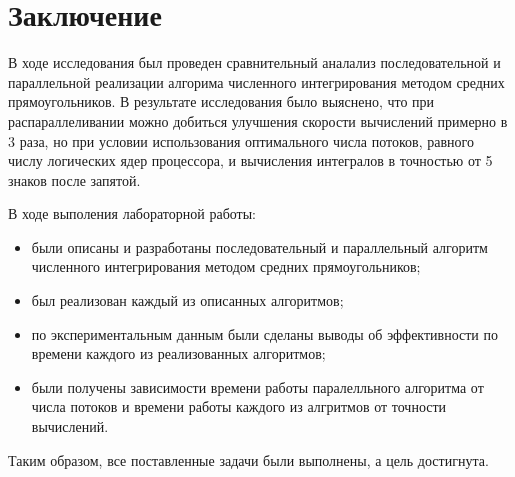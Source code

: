 \chapter*{Заключение}

В ходе исследования был проведен сравнительный аналализ последовательной
и параллельной реализации алгорима численного интегрирования методом
средних прямоугольников. В результате исследования было выяснено, что
при распараллеливании можно добиться улучшения скорости вычислений примерно
в 3 раза, но при условии использования оптимального числа потоков, равного
числу логических ядер процессора, и вычисления интегралов в точностью от 5
знаков после запятой.

В ходе выполения лабораторной работы:

\begin{itemize}[left=\parindent]
    \item были описаны и разработаны последовательный и параллельный алгоритм
          численного интегрирования методом средних прямоугольников;
    \item был реализован каждый из описанных алгоритмов;
    \item по экспериментальным данным были сделаны выводы об эффективности по
          времени каждого из реализованных алгоритмов;
    \item были получены зависимости времени работы паралелльного алгоритма
          от числа потоков и времени работы каждого из алгритмов от
          точности вычислений.
\end{itemize}

Таким образом, все поставленные задачи были выполнены, а цель достигнута.
